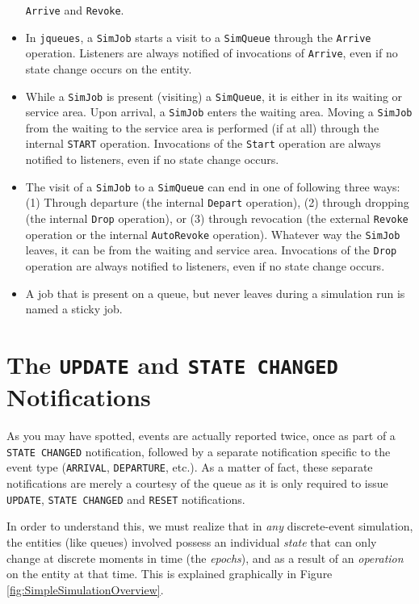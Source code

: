 \begin{itemize}
	\lstinline|Arrive| and \lstinline|Revoke|.
	\item In \lstinline|jqueues|,
	a \lstinline|SimJob| starts a visit to a \lstinline|SimQueue|
	through the \lstinline|Arrive| operation.
	Listeners are always notified of invocations of \lstinline|Arrive|,
	even if no state change occurs on the entity.
	\item While a \lstinline|SimJob| is present (visiting) a \lstinline|SimQueue|,
	it is either in its waiting or service area.
	Upon arrival, a \lstinline|SimJob| enters the waiting area.
	Moving a \lstinline|SimJob| from the waiting to the service area
	is performed (if at all) through the internal \lstinline|START|
	operation.
	Invocations of the \lstinline|Start| operation are always notified to
	listeners, even if no state change occurs.
	\item The visit of a \lstinline|SimJob| to a \lstinline|SimQueue|
	can end in one of following three ways: (1) Through departure
	(the internal \lstinline|Depart| operation), (2) through dropping
	(the internal \lstinline|Drop| operation), or (3) through revocation
	(the external \lstinline|Revoke| operation or the internal \lstinline|AutoRevoke| operation).
	Whatever way the \lstinline|SimJob| leaves, it can be from the waiting
	and service area.
	Invocations of the \lstinline|Drop| operation are always notified to
	listeners, even if no state change occurs.
	\item A job that is present on a queue, but never leaves during a simulation run
	is named a sticky job.
\end{itemize}

\section{The \texttt{UPDATE} and \texttt{STATE CHANGED} Notifications}

As you may have spotted,
events are actually reported twice,
once as part of a \lstinline|STATE CHANGED| notification,
followed by a separate notification specific to the event type
(\lstinline-ARRIVAL-, \lstinline-DEPARTURE-, etc.).
As a matter of fact, these separate notifications are merely a courtesy
of the queue as it is only required to issue
\lstinline|UPDATE|, \lstinline|STATE CHANGED| and \lstinline|RESET| notifications.

In order to understand this,
  we must realize that in {\em any\/} discrete-event simulation,
  the entities (like queues) involved possess an individual {\em state\/}
  that can only change at discrete moments in time (the {\em epochs\/}),
  and as a result of an {\em operation\/} on the entity at that time.
This is explained graphically in Figure \ref{fig:SimpleSimulationOverview}.


